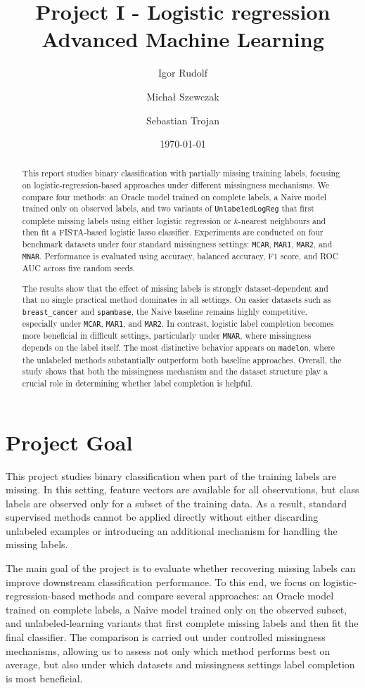 \documentclass[8pt,a4paper]{extarticle}
\title{
    \textbf{Project I - Logistic regression} \\[0.5cm]
    \large Advanced Machine Learning
}
\author{Igor Rudolf \and Michał Szewczak \and Sebastian Trojan}
\date{\today}
\begin{document}
\maketitle
\newpage
\begin{abstract}
This report studies binary classification with partially missing training labels, focusing on logistic-regression-based approaches under different missingness mechanisms. We compare four methods: an Oracle model trained on complete labels, a Naive model trained only on observed labels, and two variants of \texttt{UnlabeledLogReg} that first complete missing labels using either logistic regression or $k$-nearest neighbours and then fit a FISTA-based logistic lasso classifier. Experiments are conducted on four benchmark datasets under four standard missingness settings: \texttt{MCAR}, \texttt{MAR1}, \texttt{MAR2}, and \texttt{MNAR}. Performance is evaluated using accuracy, balanced accuracy, F1 score, and ROC AUC across five random seeds.

The results show that the effect of missing labels is strongly dataset-dependent and that no single practical method dominates in all settings. On easier datasets such as \texttt{breast\_cancer} and \texttt{spambase}, the Naive baseline remains highly competitive, especially under \texttt{MCAR}, \texttt{MAR1}, and \texttt{MAR2}. In contrast, logistic label completion becomes more beneficial in difficult settings, particularly under \texttt{MNAR}, where missingness depends on the label itself. The most distinctive behavior appears on \texttt{madelon}, where the unlabeled methods substantially outperform both baseline approaches. Overall, the study shows that both the missingness mechanism and the dataset structure play a crucial role in determining whether label completion is helpful.
\end{abstract}
\newpage
\tableofcontents
\newpage
\section{Project Goal}
This project studies binary classification when part of the training labels are missing. In this setting, feature vectors are available for all observations, but class labels are observed only for a subset of the training data. As a result, standard supervised methods cannot be applied directly without either discarding unlabeled examples or introducing an additional mechanism for handling the missing labels.

The main goal of the project is to evaluate whether recovering missing labels can improve downstream classification performance. To this end, we focus on logistic-regression-based methods and compare several approaches: an Oracle model trained on complete labels, a Naive model trained only on the observed subset, and unlabeled-learning variants that first complete missing labels and then fit the final classifier. The comparison is carried out under controlled missingness mechanisms, allowing us to assess not only which method performs best on average, but also under which datasets and missingness settings label completion is most beneficial.
\end{document}
